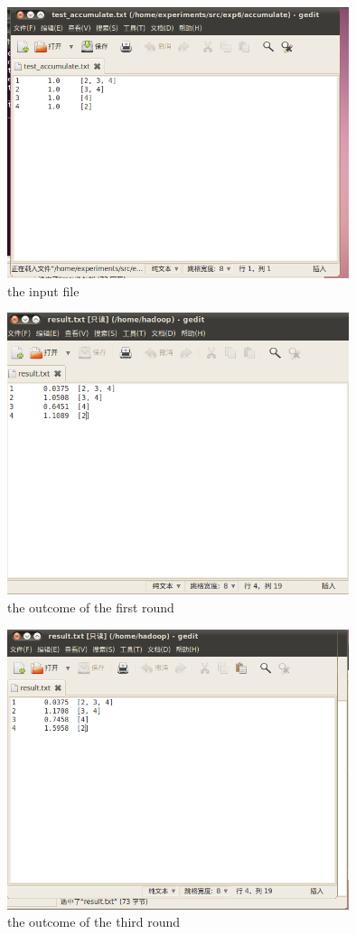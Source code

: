 \documentclass{article}
\begin{document}
\begin{figure}[htbp]
\centering
\includegraphics[width=10cm]{3.png}
\caption{the input file}
\end{figure}
\begin{figure}[htbp]
\centering
\includegraphics[width=10cm]{2.png}
\caption{the outcome of the first round}
\end{figure}
\begin{figure}[htbp]
\centering
\includegraphics[width=10cm]{0.png}
\caption{the outcome of the third round}
\end{figure}
\end{document}
